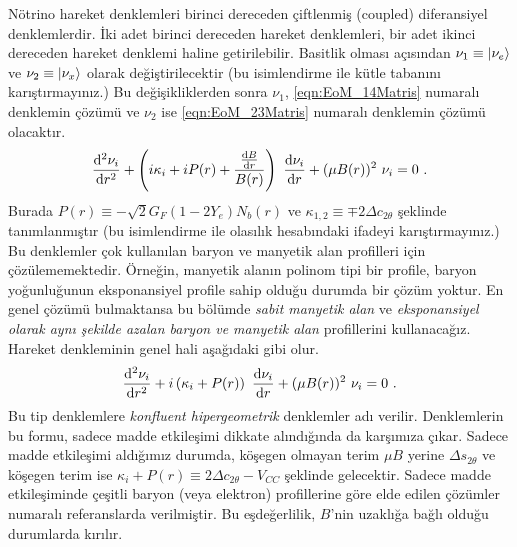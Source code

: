Nötrino hareket denklemleri birinci dereceden çiftlenmiş (coupled) diferansiyel denklemlerdir. İki adet birinci dereceden hareket denklemleri, bir adet ikinci dereceden hareket denklemi haline getirilebilir. Basitlik olması açısından $ \nu_{1} \equiv \ket{\nu_{e}} $ ve $ \nu_{2} \equiv \ket{\nu_{x}} $ olarak değiştirilecektir (bu isimlendirme ile kütle tabanını karıştırmayınız.) Bu değişikliklerden sonra $ \nu_{1} $, \eqref{eqn:EoM_14Matris} numaralı denklemin çözümü ve $ \nu_{2} $ ise \eqref{eqn:EoM_23Matris} numaralı denklemin çözümü olacaktır.
\begin{equation}
	\dv[2]{\nu_{i}}{r} + \left(i\kappa_{i}+iP(r) + \frac{\dv{B}{r}}{B(r)}\right) 
    ~\dv{\nu_{i}}{r}+ (\mu B(r))^{2}~ \nu_{i} = 0 \text{ .}
\end{equation}
Burada $ P(r) \equiv -\sqrt{2}G_{F}(1-2Y_{e})N_{b}(r) $ ve $ \kappa_{1,2} \equiv \mp 2\Delta c_{2\theta} $ şeklinde tanımlanmıştır (bu isimlendirme ile olasılık hesabındaki ifadeyi karıştırmayınız.) Bu denklemler çok kullanılan baryon ve manyetik alan profilleri için çözülememektedir. Örneğin, manyetik alanın polinom tipi bir profile, baryon yoğunluğunun eksponansiyel profile sahip olduğu durumda bir çözüm yoktur. En genel çözümü bulmaktansa bu bölümde \emph{sabit manyetik alan} ve \emph{eksponansiyel olarak aynı şekilde azalan baryon ve manyetik alan} profillerini kullanacağız. Hareket denkleminin genel hali aşağıdaki gibi olur.
\begin{equation}\label{eqn:app_diffeqConstB}
    \dv[2]{\nu_{i}}{r} + i\left(\kappa_{i}+P(r)\right) ~\dv{\nu_{i}}{r}+ 
    (\mu B(r))^{2}~ \nu_{i} = 0 \text{ .}
\end{equation}
Bu tip denklemlere \emph{konfluent hipergeometrik} denklemler adı verilir. Denklemlerin bu formu, sadece madde etkileşimi dikkate alındığında da karşımıza çıkar. Sadece madde etkileşimi aldığımız durumda, köşegen olmayan terim $ \mu B $ yerine $ \Delta s_{2\theta} $ ve köşegen terim ise $ \kappa_{i} + P(r) \equiv 2\Delta c_{2\theta} - V_{CC} $ şeklinde gelecektir. Sadece madde etkileşiminde çeşitli baryon (veya elektron) profillerine göre elde edilen çözümler \cite{Ito:1987vy,Toshev:1987jw,Kaneko:1987zza, Notzold:1987cq, Kuo:1989qe,Balantekin:1996ag} numaralı referanslarda verilmiştir. Bu eşdeğerlilik, $ B $'nin uzaklığa bağlı olduğu durumlarda kırılır. 

